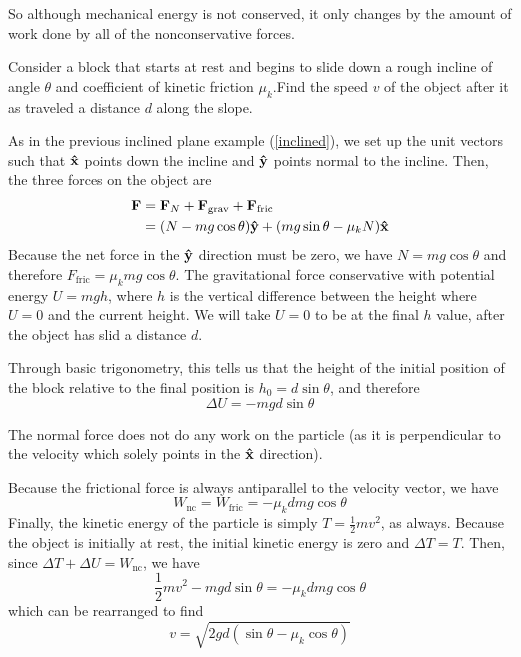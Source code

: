 So although mechanical energy is not conserved, it only changes by the amount of work done by all of the nonconservative forces.
\begin{example}
    Consider a block that starts at rest and begins to slide down a rough incline of angle $\theta$ and coefficient of kinetic friction $\mu_k$.Find the speed $v$ of the object after it as traveled a distance $d$ along the slope. 

    As in the previous inclined plane example (\ref{inclined}), we set up the unit vectors such that $\mathbf{\hat{x}}$ points down the incline and $\mathbf{\hat{y}}$ points normal to the incline. Then, the three forces on the object are 
    \begin{align*}
        \mathbf{F} &= \mathbf{F}_N + \mathbf{F}_\text{grav} + \mathbf{F}_\text{fric} \\
        &= (N - mg\cos\theta)\mathbf{\hat{y}} + (mg\sin\theta - \mu_k N)\mathbf{\hat{x}}
    \end{align*}
    Because the net force in the $\mathbf{\hat{y}}$ direction must be zero, we have $N = mg\cos\theta$ and therefore $F_\text{fric} = \mu_k mg \cos \theta$. The gravitational force conservative with potential energy $U = mgh$, where $h$ is the vertical difference between the height where $U=0$ and the current height. We will take $U=0$ to be at the final $h$ value, after the object has slid a distance $d$.

    Through basic trigonometry, this tells us that the height of the initial position of the block relative to the final position is $h_0 = d\sin\theta$, and therefore
    \[ \Delta U = -mgd\sin\theta \]
    
    The normal force does not do any work on the particle (as it is perpendicular to the velocity which solely points in the $\mathbf{\hat{x}}$ direction).  

    Because the frictional force is always antiparallel to the velocity vector, we have
    \[ W_\text{nc} = W_\text{fric} = -\mu_k dmg\cos\theta \]
    Finally, the kinetic energy of the particle is simply $T = \frac{1}{2}mv^2$, as always. Because the object is initially at rest, the initial kinetic energy is zero and $\Delta T = T$. Then, since $\Delta T + \Delta U = W_\text{nc}$, we have
    \[ \frac{1}{2}mv^2 - mgd\sin\theta = -\mu_k dmg\cos\theta \]
    which can be rearranged to find
    \[ v = \sqrt{2gd(\sin\theta-\mu_k \cos\theta)}\]
\end{example}
